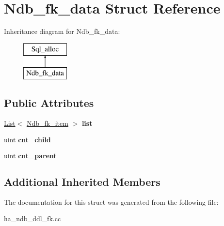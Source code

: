 \hypertarget{structNdb__fk__data}{}\section{Ndb\+\_\+fk\+\_\+data Struct Reference}
\label{structNdb__fk__data}
Inheritance diagram for Ndb\+\_\+fk\+\_\+data\+:\begin{figure}[H]
\begin{center}
\leavevmode
\includegraphics[height=2.000000cm]{structNdb__fk__data}
\end{center}
\end{figure}
\subsection*{Public Attributes}
\begin{DoxyCompactItemize}
\item 
\mbox{\label{structNdb__fk__data_a2ea61a2ffabb374182b2531464b8574f}} 
\mbox{\hyperlink{classList}{List}}$<$ \mbox{\hyperlink{structNdb__fk__item}{Ndb\+\_\+fk\+\_\+item}} $>$ {\bfseries list}
\item 
\mbox{\label{structNdb__fk__data_a0e3ad14eb291d9f008e9090671c21e03}} 
uint {\bfseries cnt\+\_\+child}
\item 
\mbox{\label{structNdb__fk__data_a98dc682c06b072fc460ec40bd8d3fb91}} 
uint {\bfseries cnt\+\_\+parent}
\end{DoxyCompactItemize}
\subsection*{Additional Inherited Members}


The documentation for this struct was generated from the following file\+:\begin{DoxyCompactItemize}
\item 
ha\+\_\+ndb\+\_\+ddl\+\_\+fk.\+cc\end{DoxyCompactItemize}
